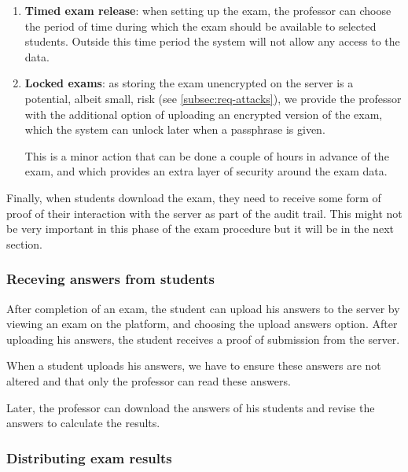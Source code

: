 \documentclass{article}
\begin{document}
\begin{enumerate}

\item \textbf{Timed exam release}: when setting up the exam, the professor can
choose the period of time during which the exam should be available to selected
students. Outside this time period the system will not allow any access to the
data.

\item \textbf{Locked exams}: as storing the exam unencrypted on the server is a
potential, albeit small, risk (see \autoref{subsec:req-attacks}), we provide the
professor with the additional option of uploading an encrypted version of the
exam, which the system can unlock later when a passphrase is given.

This is a minor action that can be done a couple of hours in advance of the
exam, and which provides an extra layer of security around the exam data.

\end{enumerate}

Finally, when students download the exam, they need to receive some form of
proof of their interaction with the server as part of the audit trail. This
might not be very important in this phase of the exam procedure but it will be
in the next section.

\subsubsection{Receving answers from students}

After completion of an exam, the student can upload his answers to the server
by viewing an exam on the platform, and choosing the upload answers option.
After uploading his answers, the student receives a proof of submission from
the server.

When a student uploads his answers, we have to ensure these answers are not
altered and that only the professor can read these answers.

Later, the professor can download the answers of his students and revise the
answers to calculate the results.

\subsubsection{Distributing exam results}
\end{document}
